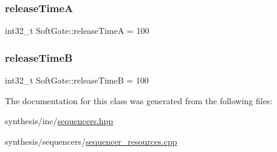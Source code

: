 \mbox{\label{class_soft_gate_a4e162f5775e4d32ae64dd8d4c5a7b1b9}} 
\subsubsection{\texorpdfstring{release\+TimeA}{releaseTimeA}}
{\footnotesize\ttfamily int32\+\_\+t Soft\+Gate\+::release\+TimeA = 100}

\mbox{\label{class_soft_gate_ae07c5a6e329100d8667a2ae1526e445d}} 
\subsubsection{\texorpdfstring{release\+TimeB}{releaseTimeB}}
{\footnotesize\ttfamily int32\+\_\+t Soft\+Gate\+::release\+TimeB = 100}



The documentation for this class was generated from the following files\+:\begin{DoxyCompactItemize}
\item 
synthesis/inc/\mbox{\hyperlink{sequencers_8hpp}{sequencers.\+hpp}}\item 
synthesis/sequencers/\mbox{\hyperlink{sequencer__resources_8cpp}{sequencer\+\_\+resources.\+cpp}}\end{DoxyCompactItemize}
